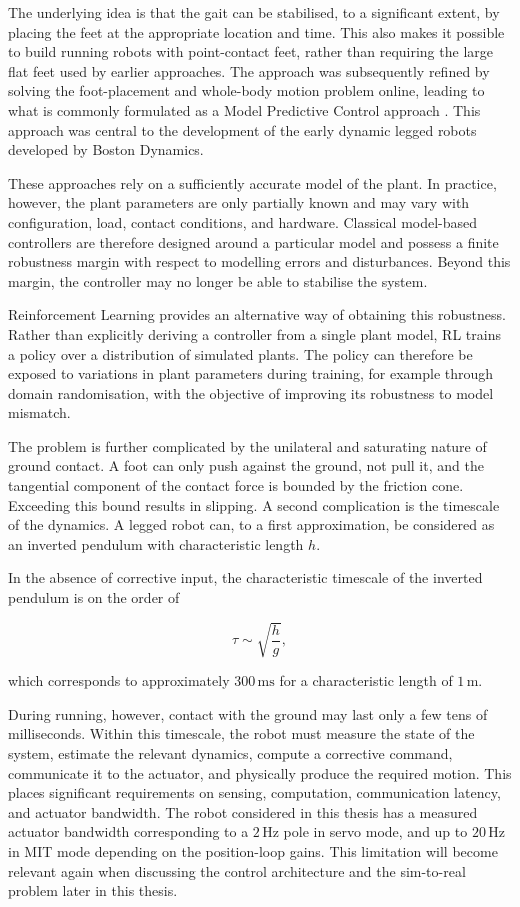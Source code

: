 The underlying idea is that the gait can be stabilised, to a significant extent, by placing the feet at the appropriate location and time. This also makes it possible to build running robots with point-contact feet, rather than requiring the large flat feet used by earlier approaches. The approach was subsequently refined by solving the foot-placement and whole-body motion problem online, leading to what is commonly formulated as a Model Predictive Control approach \cite{kuindersma2016atlas}. This approach was central to the development of the early dynamic legged robots developed by Boston Dynamics.

These approaches rely on a sufficiently accurate model of the plant. In practice, however, the plant parameters are only partially known and may vary with configuration, load, contact conditions, and hardware. Classical model-based controllers are therefore designed around a particular model and possess a finite robustness margin with respect to modelling errors and disturbances. Beyond this margin, the controller may no longer be able to stabilise the system.

Reinforcement Learning provides an alternative way of obtaining this robustness. Rather than explicitly deriving a controller from a single plant model, RL trains a policy over a distribution of simulated plants. The policy can therefore be exposed to variations in plant parameters during training, for example through domain randomisation, with the objective of improving its robustness to model mismatch.

The problem is further complicated by the unilateral and saturating nature of ground contact. A foot can only push against the ground, not pull it, and the tangential component of the contact force is bounded by the friction cone. Exceeding this bound results in slipping. A second complication is the timescale of the dynamics. A legged robot can, to a first approximation, be considered as an inverted pendulum with characteristic length $h$.

In the absence of corrective input, the characteristic timescale of the inverted pendulum is on the order of

\begin{equation}
\tau \sim \sqrt{\frac{h}{g}},
\end{equation}

which corresponds to approximately $300\,\mathrm{ms}$ for a characteristic length of $1\,\mathrm{m}$.

During running, however, contact with the ground may last only a few tens of milliseconds.
Within this timescale, the robot must measure the state of the system, estimate the relevant dynamics, compute a corrective command, communicate it to the actuator, and physically produce the required motion.
This places significant requirements on sensing, computation, communication latency, and actuator bandwidth.
The robot considered in this thesis has a measured actuator bandwidth corresponding to a $2\,\mathrm{Hz}$ pole in servo mode, and up to $20\,\mathrm{Hz}$ in MIT mode depending on the position-loop gains.
This limitation will become relevant again when discussing the control architecture and the sim-to-real problem later in this thesis.

